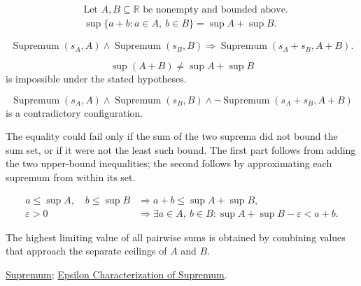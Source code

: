 \begin{remark*}
\[
\begin{aligned}
&\text{Let }A,B\subseteq\mathbb{R}\text{ be nonempty and bounded above.}\\
&\sup\{a+b:a\in A,\ b\in B\}=\sup A+\sup B.
\end{aligned}
\]
\end{remark*}

\begin{remark*}
\[
\operatorname{Supremum}(s_A,A)\land \operatorname{Supremum}(s_B,B)
\Longrightarrow
\operatorname{Supremum}(s_A+s_B,A+B).
\]
\end{remark*}

\begin{remark*}
\[
\sup(A+B)\ne \sup A+\sup B
\]
is impossible under the stated hypotheses.
\end{remark*}

\begin{remark*}
\[
\operatorname{Supremum}(s_A,A)\land \operatorname{Supremum}(s_B,B)
\land
\neg\operatorname{Supremum}(s_A+s_B,A+B)
\]
is a contradictory configuration.
\end{remark*}

\begin{remark*}
The equality could fail only if the sum of the two suprema did not bound the sum set, or if it were not the least such bound. The first part follows from adding the two upper-bound inequalities; the second follows by approximating each supremum from within its set.
\end{remark*}

\begin{remark*}
\[
\begin{aligned}
a\le \sup A,\quad b\le \sup B
&\Longrightarrow a+b\le \sup A+\sup B,\\
\varepsilon>0
&\Longrightarrow
\exists a\in A,\ b\in B:
\sup A+\sup B-\varepsilon<a+b.
\end{aligned}
\]
\end{remark*}

\begin{remark*}[Interpretation]
The highest limiting value of all pairwise sums is obtained by combining values that approach the separate ceilings of $A$ and $B$.
\end{remark*}

\begin{dependencies}
\hyperref[def:supremum]{Supremum};
\hyperref[def:epsilon-characterization-of-supremum]{Epsilon Characterization of Supremum}.
\end{dependencies}






















